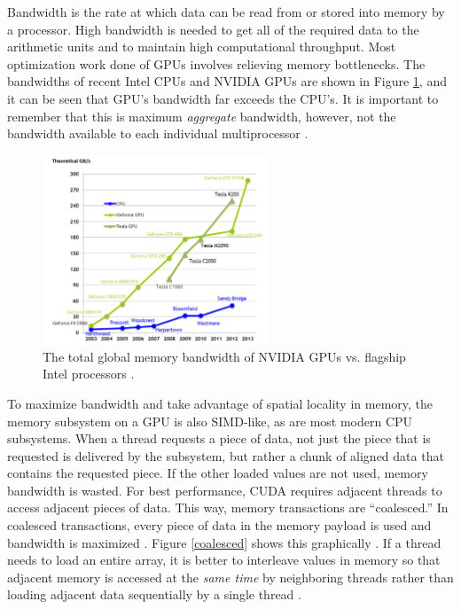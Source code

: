 Bandwidth is the rate at which data can be read from or stored into memory by a processor. High bandwidth is needed to get all of the required data to the arithmetic units and to maintain high computational throughput.  Most optimization work done of GPUs involves relieving memory bottlenecks.  The bandwidths of recent Intel CPUs and NVIDIA GPUs are shown in Figure \ref{bandwidth}, and it can be seen that GPU's bandwidth far exceeds the CPU's.  It is important to remember that this is maximum \emph{aggregate} bandwidth, however, not the bandwidth available to each individual multiprocessor \cite{cuda}.   

\begin{figure}[h!] 
  \centering
    \includegraphics[width=0.6\textwidth]{graphics/memory_bandwidth.pdf}
     \caption[The total global memory bandwidth of NVIDIA GPUs vs.\ flagship Intel processors.]{The total global memory bandwidth of NVIDIA GPUs vs. flagship Intel processors \cite{cuda}. \label{bandwidth}}
\end{figure}

To maximize bandwidth and take advantage of spatial locality in memory, the memory subsystem on a GPU is also SIMD-like, as are most modern CPU subsystems.  When a thread requests a piece of data, not just the piece that is requested is delivered by the subsystem, but rather a chunk of aligned data that contains the requested piece.  If the other loaded values are not used, memory bandwidth is wasted.  For best performance, CUDA requires adjacent threads to access adjacent pieces of data.  This way, memory transactions are ``coalesced.''   In coalesced transactions, every piece of data in the memory payload is used and bandwidth is maximized \cite{cuda}.  Figure \ref{coalesced} shows this graphically \cite{programming_massively}.  If a thread needs to load an entire array, it is better to interleave values in memory so that adjacent memory is accessed at the \emph{same time} by neighboring threads rather than loading adjacent data sequentially by a single thread \cite{cuda}.

